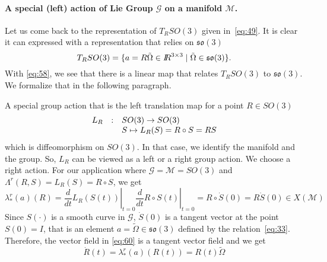 \paragraph{ A special  (left)  action of Lie Group $\mathcal G$ on a manifold $\mathcal M$. } 

Let us come back to the representation of  $T_RSO(3)$ given in~\eqref{eq:49}. It is clear it can expressed with a representation that relies on $\mathfrak{so}(3)$
\begin{equation}
  \label{eq:58}
   T_RSO(3) = \{ a = R \tilde \Omega \in \mbox{\rm $I\!\!R$}^{3\times 3} \mid \tilde \Omega \in \mathfrak{so}(3) \}.
\end{equation}
With \eqref{eq:58}, we see that there is a linear map that relates $T_RSO(3)$ to  $\mathfrak{so}(3)$. We formalize that in the following paragraph.


A special group action that is  the left translation map for a point $R \in SO(3)$ 
\begin{equation}
  \label{eq:59}
  \begin{array}[lcl]{rcl}
    L_R& :&   SO(3)  \rightarrow  SO(3)\\
       & &  S  \mapsto L_R(S) = R \circ S = RS\\
  \end{array}
\end{equation}
which is diffeomorphism on $SO(3)$. In that case, we identify the manifold and the group. So, $L_R$ can be viewed as a left or a right group action. We choose a right action. For our application where $\mathcal G = \mathcal M = SO(3)$ and $\Lambda^r(R,S) = L_{R}(S) =  R \circ S $, we get
\begin{equation}
  \label{eq:60}
   \lambda^r_{*}(a)(R) = \left. \frac{d}{dt} L_{R}(S(t)) \right|_{t=0} \left. \frac{d}{dt} R \circ S(t) \right|_{t=0} =  R \circ \dot S(0) = R  \dot S(0)  \in X(\mathcal M)
\end{equation}
Since $S(\cdot)$ is a smooth curve in $\mathcal G$, $\dot S(0)$ is a tangent vector at the point $S(0)=I$, that is an element $a = \tilde \Omega  \in \mathfrak{so}(3) $ defined by the relation~\eqref{eq:33}. Therefore, the vector field in \eqref{eq:60} is a tangent vector field and we get
\begin{equation}
  \label{eq:61}
  \dot R(t) = \lambda^r_{*}(a)(R(t)) = R(t)  \tilde \Omega
\end{equation}



